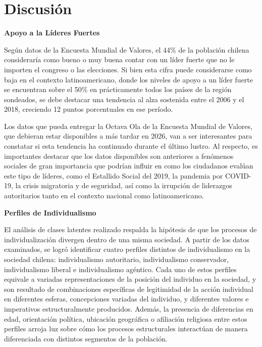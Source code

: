 \documentclass[12pt,twoside]{templates/facsothesis}
\begin{document}
\hypertarget{discusiuxf3n}{%
\chapter{Discusión}\label{discusiuxf3n}}

\textbf{Apoyo a la Líderes Fuertes}

Según datos de la Encuesta Mundial de Valores, el 44\% de la población chilena consideraría como bueno o muy buena contar con un líder fuerte que no le importen el congreso o las elecciones. Si bien esta cifra puede considerarse como baja en el contexto latinoamericano, donde los niveles de apoyo a un líder fuerte se encuentran sobre el 50\% en prácticamente todos los países de la región sondeados, se debe destacar una tendencia al alza sostenida entre el 2006 y el 2018, creciendo 12 puntos porcentuales en ese período.

Los datos que pueda entregar la Octava Ola de la Encuesta Mundial de Valores, que debieran estar disponibles a más tardar en 2026, van a ser interesantes para constatar si esta tendencia ha continuado durante el último lustro. Al respecto, es importantes destacar que los datos disponibles son anteriores a fenómenos sociales de gran importancia que podrían influir en como los ciudadanos evalúan este tipo de líderes, como el Estallido Social del 2019, la pandemia por COVID-19, la crisis migratoria y de seguridad, así como la irrupción de liderazgos autoritarios tanto en el contexto nacional como latinoamericano.

\textbf{Perfiles de Individualismo}

El análisis de clases latentes realizado respalda la hipótesis de que los procesos de individualización divergen dentro de una misma sociedad. A partir de los datos examinados, se logró identificar cuatro perfiles distintos de individualismo en la sociedad chilena: individualismo autoritario, individualismo conservador, individualismo liberal e individualismo agéntico. Cada uno de estos perfiles equivale a variadas representaciones de la posición del individuo en la sociedad, y son resultado de combinaciones específicas de legitimidad de la acción individual en diferentes esferas, concepciones variadas del individuo, y diferentes valores e imperativos estructuralmente producidos. Además, la presencia de diferencias en edad, orientación política, ubicación geográfica o afiliación religiosa entre estos perfiles arroja luz sobre cómo los procesos estructurales interactúan de manera diferenciada con distintos segmentos de la población.
\end{document}
